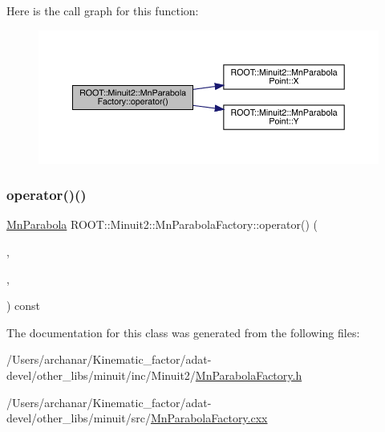 Here is the call graph for this function\+:
\nopagebreak
\begin{figure}[H]
\begin{center}
\leavevmode
\includegraphics[width=350pt]{d2/dd8/classROOT_1_1Minuit2_1_1MnParabolaFactory_ab4b6a74b071f4d780dbf6b4663c188b3_cgraph}
\end{center}
\end{figure}
\mbox{\label{classROOT_1_1Minuit2_1_1MnParabolaFactory_ab4b6a74b071f4d780dbf6b4663c188b3}} 
\subsubsection{\texorpdfstring{operator()()}{operator()()}\hspace{0.1cm}{\footnotesize\ttfamily [6/6]}}
{\footnotesize\ttfamily \mbox{\hyperlink{classROOT_1_1Minuit2_1_1MnParabola}{Mn\+Parabola}} R\+O\+O\+T\+::\+Minuit2\+::\+Mn\+Parabola\+Factory\+::operator() (\begin{DoxyParamCaption}\item[{const \mbox{\hyperlink{classROOT_1_1Minuit2_1_1MnParabolaPoint}{Mn\+Parabola\+Point}} \&}]{,  }\item[{double}]{,  }\item[{const \mbox{\hyperlink{classROOT_1_1Minuit2_1_1MnParabolaPoint}{Mn\+Parabola\+Point}} \&}]{ }\end{DoxyParamCaption}) const}



The documentation for this class was generated from the following files\+:\begin{DoxyCompactItemize}
\item 
/\+Users/archanar/\+Kinematic\+\_\+factor/adat-\/devel/other\+\_\+libs/minuit/inc/\+Minuit2/\mbox{\hyperlink{adat-devel_2other__libs_2minuit_2inc_2Minuit2_2MnParabolaFactory_8h}{Mn\+Parabola\+Factory.\+h}}\item 
/\+Users/archanar/\+Kinematic\+\_\+factor/adat-\/devel/other\+\_\+libs/minuit/src/\mbox{\hyperlink{adat-devel_2other__libs_2minuit_2src_2MnParabolaFactory_8cxx}{Mn\+Parabola\+Factory.\+cxx}}\end{DoxyCompactItemize}
